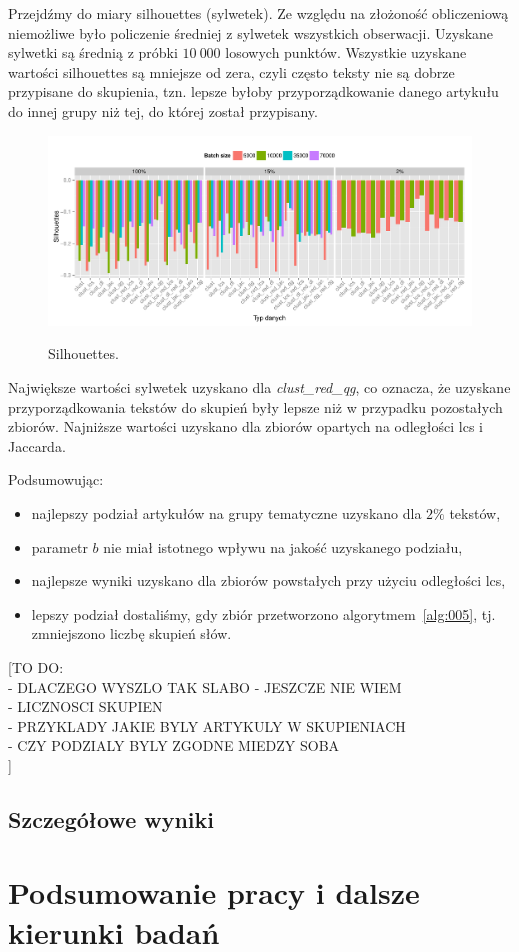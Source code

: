 \documentclass{praca1}
\begin{document}
Przejdźmy do miary silhouettes (sylwetek). Ze względu na złożoność obliczeniową niemożliwe było policzenie średniej z sylwetek wszystkich obserwacji. Uzyskane sylwetki są średnią z próbki $10\ 000$ losowych punktów. Wszystkie uzyskane wartości silhouettes są mniejsze od zera, czyli często teksty nie są dobrze przypisane do skupienia, tzn. lepsze byłoby przyporządkowanie danego artykułu do innej grupy niż tej, do której został przypisany.

\begin{figure}[!h]
  \centering
  \includegraphics[width=400pt]{plot14.pdf}\\
  \caption{Silhouettes.}\label{plot:009}
\end{figure}

Największe wartości sylwetek uzyskano dla \emph{clust\_red\_qg}, co oznacza, że uzyskane przyporządkowania tekstów do skupień były lepsze niż w przypadku pozostałych zbiorów. Najniższe wartości uzyskano dla zbiorów opartych na odległości lcs i Jaccarda.

Podsumowując:
\begin{itemize}
\item najlepszy podział artykułów na grupy tematyczne uzyskano dla $2\%$ tekstów,
\item parametr $b$ nie miał istotnego wpływu na jakość uzyskanego podziału,
\item najlepsze wyniki uzyskano dla zbiorów powstałych przy użyciu odległości lcs,
\item lepszy podział dostaliśmy, gdy zbiór przetworzono algorytmem~\ref{alg:005}, tj. zmniejszono liczbę skupień słów.
\end{itemize}

[TO DO:\\
- DLACZEGO WYSZLO TAK SLABO - JESZCZE NIE WIEM\\
- LICZNOSCI SKUPIEN\\
- PRZYKLADY JAKIE BYLY ARTYKULY W SKUPIENIACH\\
- CZY PODZIALY BYLY ZGODNE MIEDZY SOBA\\
]

\section{Szczegółowe wyniki}

\chapter{Podsumowanie pracy i dalsze kierunki badań}






\end{document}
